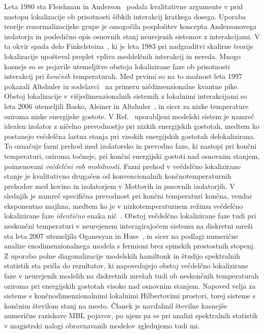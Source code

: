 Leta 1980 sta Fleishman in Anderson~\cite{fleishman1980interactions} podala kvalitativne argumente v prid nastopu lokalizacije ob prisotnosti šibkih interakcij kratkega dosega. Uporaba teorije renormalizacijske grupe je omogočila posplošitev koncepta Andersonovega izolatorja in posledično opis osnovnih stanj neurejenih sistemov z interakcijami. V ta okvir spada delo Finkelsteina~\cite{finkelshtein1983influence}, ki je leta 1983 pri nadgraditvi skalirne teorije lokalizacije upošteval preplet vpliva meddelčnih interakcij in nereda. Mnogo kasneje so se pojavile utemeljitve obstoja lokalizirane faze ob prisotnosti interakcij pri \emph{končnih} temperaturah. Med prvimi so na to možnost leta 1997 pokazali Altshuler in sodelavci~\cite{altshuler1997quasiparticle} na primeru ničdimenzionalne kvantne pike. Obstoj lokalizacije v višjedimenzionalnih sistemih z lokalnimi interakcijami so leta 2006 utemeljili Basko, Aleiner in Altshuler~\cite{basko2006metal}, in sicer za nizke temperature oziroma nizke energijske gostote. V Ref.~\cite{basko2006metal} uporabljeni modelski sistem je namreč idealen izolator z ničelno prevodnostjo pri nizkih energijskih gostotah, medtem ko postanejo večdelčna lastna stanja pri visokih energijskih gostotah delokalizirana. To označuje fazni prehod med izolatorsko in prevodno fazo, ki nastopi pri končni temperaturi, oziroma točneje, pri končni energijski gostoti nad osnovnim stanjem, poimenovani \emph{večdelčni rob mobilnosti}. Fazni prehod v večdelčno lokalizirano stanje je kvalitativno drugačen od konvencionalnih končnotemperaturnih prehodov med kovino in izolatorjem v Mottovih in pasovnih izolatorjih. V slednjih je namreč specifična prevodnost pri končni temperaturi končna, vendar eksponentno majhna, medtem ko je v nizkotemperaturnem režimu večdelčno lokalizirane faze \emph{identično} enaka nič~\cite{basko2006problem}. Obstoj večdelčno lokalizirane faze tudi pri neskončni temperaturi v neurejenem interagirajočem sistemu na diskretni mreži sta leta 2007 utemeljila Oganesyan in Huse~\cite{PhysRevB.75.155111}, in sicer na podlagi numerične analize enodimenzionalnega modela s fermioni brez spinskih prostostnih stopenj. Z uporabo polne diagonalizacije modelskih hamiltonk in študijo spektralnih statistik sta prišla do rezultatov, ki napovedujejo obstoj večdelčno lokalizirane faze v neurejenih modelih na diskretnih mrežah tudi ob neskončnih temperaturah oziroma pri energijskih gostotah visoko nad osnovnim stanjem. Napoved velja za sisteme s končnodimenzionalnimi lokalnimi Hilbertovimi prostori, torej sisteme s končnim številom stanj na mesto. 
Članek je navdahnil številne kasnejše numerične raziskave MBL pojavov, po njem pa se pri analizi spektralnih statistik v magistrski nalogi obravnavanih modelov zgledujemo tudi mi.
